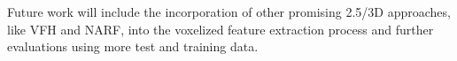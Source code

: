 \documentclass[a4paper, 10 pt, conference]{sty/ieeeconf}
\begin{document}



Future work will include the incorporation of other promising 2.5/3D approaches, like VFH and NARF,
into the voxelized feature extraction process and further evaluations using more test and training data.




%

\end{document}

